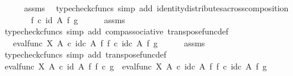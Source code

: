 \begin{isabellebody}
\ \ \ \ \isamarkupfalse%
\ assms\ \isamarkupfalse%
\ {\isacharparenleft}{\kern0pt}typecheck{\isacharunderscore}{\kern0pt}cfuncs{\isacharcomma}{\kern0pt}\ simp\ add{\isacharcolon}{\kern0pt}\ identity{\isacharunderscore}{\kern0pt}distributes{\isacharunderscore}{\kern0pt}across{\isacharunderscore}{\kern0pt}composition{\isacharparenright}{\kern0pt}\isanewline
\ \ \isamarkupfalse%
\ \isamarkupfalse%
\ {\isachardoublequoteopen}{\isachardot}{\kern0pt}{\isachardot}{\kern0pt}{\isachardot}{\kern0pt}\ {\isacharequal}{\kern0pt}\ f\ {\isasymcirc}\isactrlsub c\ {\isacharparenleft}{\kern0pt}id\ A\ {\isasymtimes}\isactrlsub f\ g{\isacharparenright}{\kern0pt}{\isachardoublequoteclose}\isanewline
\ \ \ \ \isamarkupfalse%
\ assms\ \isamarkupfalse%
\ {\isacharparenleft}{\kern0pt}typecheck{\isacharunderscore}{\kern0pt}cfuncs{\isacharcomma}{\kern0pt}\ simp\ add{\isacharcolon}{\kern0pt}\ comp{\isacharunderscore}{\kern0pt}associative{}\ transpose{\isacharunderscore}{\kern0pt}func{\isacharunderscore}{\kern0pt}def{\isacharparenright}{\kern0pt}\isanewline
\ \ \isamarkupfalse%
\ \isamarkupfalse%
\ {\isachardoublequoteopen}{\isachardot}{\kern0pt}{\isachardot}{\kern0pt}{\isachardot}{\kern0pt}\ {\isacharequal}{\kern0pt}\ eval{\isacharunderscore}{\kern0pt}func\ X\ A\ {\isasymcirc}\isactrlsub c\ {\isacharparenleft}{\kern0pt}id\isactrlsub c\ A\ {\isasymtimes}\isactrlsub f\ {\isacharparenleft}{\kern0pt}f\ {\isasymcirc}\isactrlsub c\ {\isacharparenleft}{\kern0pt}id\isactrlsub c\ A\ {\isasymtimes}\isactrlsub f\ g{\isacharparenright}{\kern0pt}{\isacharparenright}{\kern0pt}\isactrlsup {\isasymsharp}{\isacharparenright}{\kern0pt}{\isachardoublequoteclose}\isanewline
\ \ \ \ \isamarkupfalse%
\ assms\ \isamarkupfalse%
\ {\isacharparenleft}{\kern0pt}typecheck{\isacharunderscore}{\kern0pt}cfuncs{\isacharcomma}{\kern0pt}\ simp\ add{\isacharcolon}{\kern0pt}\ transpose{\isacharunderscore}{\kern0pt}func{\isacharunderscore}{\kern0pt}def{\isacharparenright}{\kern0pt}\isanewline
\ \ \isamarkupfalse%
\ \isamarkupfalse%
\ {\isachardoublequoteopen}eval{\isacharunderscore}{\kern0pt}func\ X\ A\ {\isasymcirc}\isactrlsub c\ {\isacharparenleft}{\kern0pt}id\ A\ {\isasymtimes}\isactrlsub f\ {\isacharparenleft}{\kern0pt}f\isactrlsup {\isasymsharp}\ {\isasymcirc}\isactrlsub c\ g{\isacharparenright}{\kern0pt}{\isacharparenright}{\kern0pt}\ {\isacharequal}{\kern0pt}\ eval{\isacharunderscore}{\kern0pt}func\ X\ A\ {\isasymcirc}\isactrlsub c\ {\isacharparenleft}{\kern0pt}id\isactrlsub c\ A\ {\isasymtimes}\isactrlsub f\ {\isacharparenleft}{\kern0pt}f\ {\isasymcirc}\isactrlsub c\ {\isacharparenleft}{\kern0pt}id\isactrlsub c\ A\ {\isasymtimes}\isactrlsub f\ g{\isacharparenright}{\kern0pt}{\isacharparenright}{\kern0pt}\isactrlsup {\isasymsharp}{\isacharparenright}{\kern0pt}{\isachardoublequoteclose}\isacommand{{\isachardot}{\kern0pt}}\isamarkupfalse%

\end{isabellebody}
